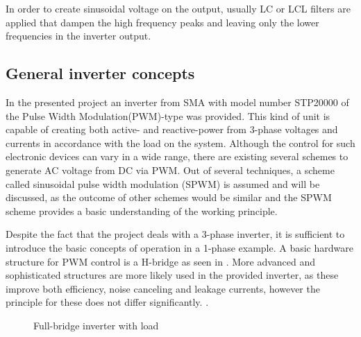 In order to create sinusoidal voltage on the output, usually LC or LCL filters are applied that dampen the high frequency peaks and leaving only the lower frequencies in the inverter output. 

\subsection{General inverter concepts}
\label{inverter}

In the presented project an inverter from SMA with model number STP20000 of the Pulse Width Modulation(PWM)-type was provided. This kind of unit is capable of creating both active- and reactive-power from 3-phase voltages and currents in accordance with the load on the system. Although the control for such electronic devices can vary in a wide range, there are existing several schemes to generate AC voltage from DC via PWM. Out of several techniques, a scheme called sinusoidal pulse width modulation (SPWM) is assumed and will be discussed, as the outcome of other schemes would be similar and the SPWM scheme provides a basic understanding of the working principle.

Despite the fact that the project deals with a 3-phase inverter, it is sufficient to introduce the basic concepts of operation in a 1-phase example.
A basic hardware structure for PWM control is a H-bridge as seen in . More advanced and sophisticated structures are more likely used in the provided inverter, as these improve both efficiency, noise canceling and leakage currents, however the principle for these does not differ significantly. \cite{aau_invert_topologies}. 


\begin{figure}[H]
\centering
{}
\caption{Full-bridge inverter with load}
\label{fig:inverterblock} 
\end{figure}
 

